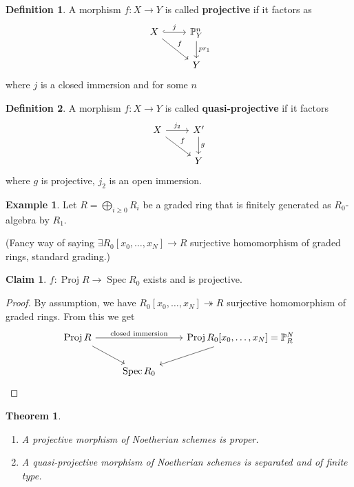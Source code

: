 \documentclass[12pt]{article}
\DeclareMathOperator{\Spec}{Spec}
\DeclareMathOperator{\Proj}{Proj}
\newtheorem*{theorem}{Theorem}
\theoremstyle{definition}
\newtheorem*{definition}{Definition}
\newtheorem*{claim}{Claim}
\newtheorem*{example}{Example}
\begin{document}
\begin{definition}
A morphism $f:X\rightarrow Y$ is called \textbf{projective} if it factors as
\[
\begin{tikzcd}
X\arrow[r,hook,"j"]\arrow[rd,"f"]&\mathbb{P}_Y^n\arrow[d,"pr_1"]\\
&Y
\end{tikzcd}
\]
where $j$ is a closed immersion and for some $n$
\end{definition}

\begin{definition}
A morphism $f:X\rightarrow Y$ is called \textbf{quasi-projective} if it factors
\[
\begin{tikzcd}
X\arrow[r,"j_2"]\arrow[rd,"f"]&X'\arrow[d,"g"]\\
&Y
\end{tikzcd}
\]
where $g$ is projective, $j_2$ is an open immersion.
\end{definition}

\begin{example}
Let $R=\bigoplus_{i\geq0}R_i$ be a graded ring that is finitely generated as $R_0$-algebra by $R_1$.

(Fancy way of saying $\exists R_0[x_0,\ldots,x_N]\rightarrow R$ surjective homomorphism of graded rings, standard grading.)

\begin{claim}
$f:\Proj R\rightarrow\Spec R_0$ exists and is projective.
\end{claim}

\begin{proof}
By assumption, we have $R_0[x_0,\ldots,x_N]\twoheadrightarrow R$ surjective homomorphism of graded rings. From this we get
\[
\begin{tikzcd}
\Proj R\arrow[rr,"\text{closed immersion}"]\arrow[rd]&&\Proj R_0[x_0,\ldots,x_N]=\mathbb{P}_R^N\arrow[ld]\\
&\Spec R_0
\end{tikzcd}
\]
\end{proof}
\end{example}

\begin{theorem}
\begin{enumerate}[label=\arabic*)]
\item A projective morphism of Noetherian schemes is proper.

\item A quasi-projective morphism of Noetherian schemes is separated and of finite type.
\end{enumerate}
\end{theorem}
\end{document}
